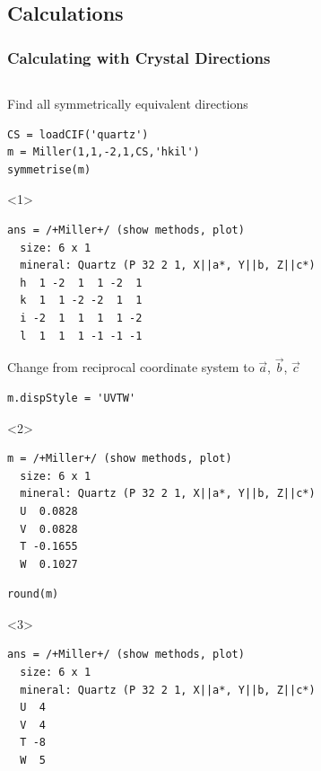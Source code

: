 \documentclass[compress]{beamer}
\begin{document}
\subsection*{Calculations}

\begin{frame}[fragile]
  \frametitle{Calculating with Crystal Directions}

   \begin{columns}
     \begin{column}{8.6cm}
         \begin{overlayarea}{\textwidth}{8cm}
           Find all symmetrically equivalent directions
           \begin{lstlisting}[style=input]
CS = loadCIF('quartz')
m = Miller(1,1,-2,1,CS,'hkil')
symmetrise(m)
           \end{lstlisting}

           \begin{onlyenv}<1>
             \vspace{-.3cm}
            \begin{lstlisting}[style=output]
ans = /+Miller+/ (show methods, plot)
  size: 6 x 1
  mineral: Quartz (P 32 2 1, X||a*, Y||b, Z||c*)
  h  1 -2  1  1 -2  1
  k  1  1 -2 -2  1  1
  i -2  1  1  1  1 -2
  l  1  1  1 -1 -1 -1
       \end{lstlisting}
     \end{onlyenv}

        \pause
        \medskip

        Change from reciprocal coordinate system to $\vec a$, $\vec b$, $\vec c$
  \begin{lstlisting}[style=input]
m.dispStyle = 'UVTW'
  \end{lstlisting}
           \begin{onlyenv}<2>
             \vspace{-.3cm}
             \begin{lstlisting}[style=output]
m = /+Miller+/ (show methods, plot)
  size: 6 x 1
  mineral: Quartz (P 32 2 1, X||a*, Y||b, Z||c*)
  U  0.0828
  V  0.0828
  T -0.1655
  W  0.1027
       \end{lstlisting}
     \end{onlyenv}

        \pause
        \vspace{-.3cm}

  \begin{lstlisting}[style=input]
round(m)
  \end{lstlisting}
           \begin{onlyenv}<3>
             \vspace{-.3cm}
             \begin{lstlisting}[style=output]
ans = /+Miller+/ (show methods, plot)
  size: 6 x 1
  mineral: Quartz (P 32 2 1, X||a*, Y||b, Z||c*)
  U  4
  V  4
  T -8
  W  5
       \end{lstlisting}
     \end{onlyenv}


\end{overlayarea}
\end{column}
\end{columns}
\end{frame}
\end{document}
